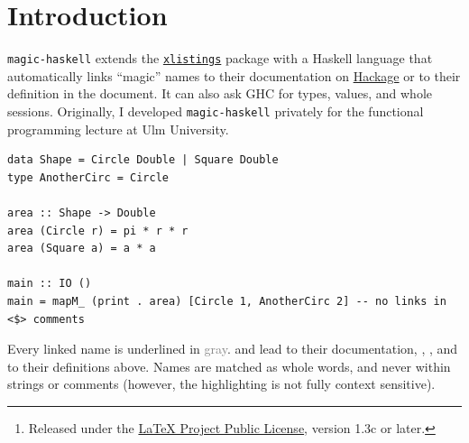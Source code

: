 \documentclass[10pt,DIV=12]{scrartcl}
\title{\T{magic-haskell}}
\subtitle{Haskell listings that link to Hackage and talk to GHC}
\author{\href{mailto:florian.sihler@web.de}{Florian Sihler}\thanks{Released under the \href{https://www.latex-project.org/lppl.txt}{LaTeX Project Public License}, version 1.3c or later.}}
\date{Version v1.0 \textendash{} 2026/09/29\\[.5ex]
  \normalsize\href{https://github.com/EagleoutIce/magic-haskell}{\T{github.com/EagleoutIce/magic-haskell}}}
\makeatletter
\let\T\texttt
\newcommand\pkg[1]{\href{\ifcsname pkgurl@#1\endcsname\csname pkgurl@#1\endcsname\else https://ctan.org/pkg/#1\fi}{\T{#1}}}
\makeatother
\begin{document}
\maketitle
\setcounter{tocdepth}{1}
\tableofcontents

\section{Introduction}
\T{magic-haskell} extends the \pkg{xlistings} package with a Haskell language that automatically links \enquote{magic} names to their documentation on \href{https://hackage.haskell.org}{Hackage} or to their definition in the document. It can also ask GHC for types, values, and whole sessions. Originally, I developed \T{magic-haskell} privately for the functional programming lecture at Ulm University.

\begin{verbatim}
data Shape = Circle Double | Square Double
type AnotherCirc = Circle

area :: Shape -> Double
area (Circle r) = pi * r * r
area (Square a) = a * a

main :: IO ()
main = mapM_ (print . area) [Circle 1, AnotherCirc 2] -- no links in <$> comments
\end{verbatim}

Every linked name is underlined in \textcolor{gray}{gray}.  and  lead to
their documentation, , , and  to their definitions above. Names are
matched as whole words, and never within strings or comments (however, the highlighting is not fully context sensitive).
\end{document}

